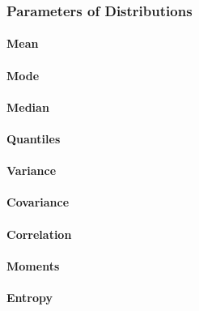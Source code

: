 
\subsubsection{Parameters of Distributions}

\paragraph{Mean}

\paragraph{Mode}

\paragraph{Median}

\paragraph{Quantiles}

\paragraph{Variance}

\paragraph{Covariance}

\paragraph{Correlation}

\paragraph{Moments}



\paragraph{Entropy}


